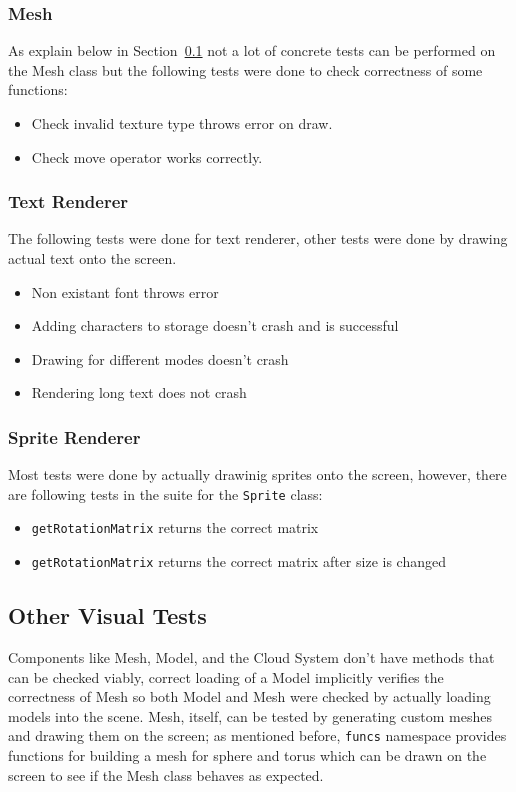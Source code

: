 \subsubsection{Mesh}
As explain below in Section~\ref{sec:viz_tests} not a lot of concrete tests can be performed on the Mesh class but the following tests were done to check correctness of some functions:
\begin{itemize}
    \item Check invalid texture type throws error on draw.
    \item Check move operator works correctly.
\end{itemize}

\subsubsection{Text Renderer}
The following tests were done for text renderer, other tests were done by drawing actual text onto the screen.
\begin{itemize}
    \item Non existant font throws error
    \item Adding characters to storage doesn't crash and is successful
    \item Drawing for different modes doesn't crash
    \item Rendering long text does not crash
\end{itemize}

\subsubsection{Sprite Renderer}
Most tests were done by actually drawinig sprites onto the screen, however, there are following tests in the suite for the \texttt{Sprite} class:
\begin{itemize}
    \item \texttt{getRotationMatrix} returns the correct matrix
    \item \texttt{getRotationMatrix} returns the correct matrix after size is changed
\end{itemize}

\subsection{Other Visual Tests}
\label{sec:viz_tests}
Components like Mesh, Model, and the Cloud System don't have methods that can be checked viably, correct loading of a Model implicitly verifies the correctness of Mesh so both Model and Mesh were checked by actually loading models into the scene. Mesh, itself, can be tested by generating custom meshes and drawing them on the screen; as mentioned before, \texttt{funcs} namespace provides functions for building a mesh for sphere and torus which can be drawn on the screen to see if the Mesh class behaves as expected.


